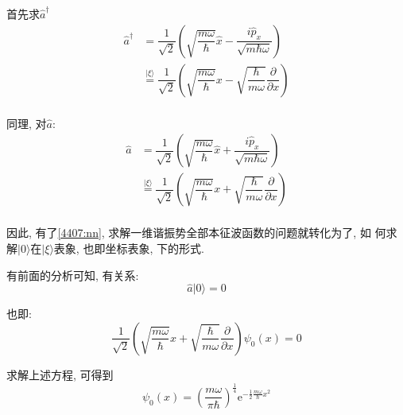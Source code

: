 \documentclass[a4paper, 11pt]{article}
\begin{document}
\begin{spacing}{1.2}
        首先求$\hat{a}^{\dagger}$
        \begin{equation}
          \begin{aligned}
            \hat{a}^{\dagger} &= \dfrac{1}{\sqrt{2}}\left(\sqrt{\dfrac{m\omega}{\hbar}}\hat{x}-%
            \dfrac{i\hat{p}_x}{\sqrt{m\hbar\omega}}\right)\\
            &\overset{|\xi\rangle}{=} \dfrac{1}{\sqrt{2}}\left(\sqrt{\dfrac{m\omega}{\hbar}}x-%
            \sqrt{\dfrac{\hbar}{m\omega}}\dfrac{\partial}{\partial{}x}\right)\\
          \end{aligned}
        \end{equation}

        同理, 对$\hat{a}$:
        \begin{equation}
          \begin{aligned}
            \hat{a}&= \dfrac{1}{\sqrt{2}}\left(\sqrt{\dfrac{m\omega}{\hbar}}\hat{x}+%
            \dfrac{i\hat{p}_x}{\sqrt{m\hbar\omega}}\right)\\
            &\overset{|\xi\rangle}{=} \dfrac{1}{\sqrt{2}}\left(\sqrt{\dfrac{m\omega}{\hbar}}x+%
            \sqrt{\dfrac{\hbar}{m\omega}}\dfrac{\partial}{\partial{}x}\right)\\    
          \end{aligned}
        \end{equation}
        
        因此, 有了\eqref{4407:nn}, 求解一维谐振势全部本征波函数的问题就转化为了, 如
        何求解$|0\rangle$在$|\xi\rangle$表象, 也即坐标表象, 下的形式. 
        
        有前面的分析可知, 有关系:
        \begin{equation}
          \hat{a}|0\rangle = 0
        \end{equation}

        也即:
        \begin{equation}
          \dfrac{1}{\sqrt{2}}\left(\sqrt{\dfrac{m\omega}{\hbar}}x+%
          \sqrt{\dfrac{\hbar}{m\omega}}\dfrac{\partial}{\partial{}x}\right)\psi_0(x) = 0
        \end{equation}

        求解上述方程, 可得到
        \begin{equation}
          \psi_0(x) = \left(\dfrac{m\omega}{\pi\hbar}\right)^{\frac{1}{4}}%
          \mathrm{e}^{-\frac{1}{2}\frac{m\omega}{\hbar}x^2}
        \end{equation}
        

\end{spacing}
\end{document}
